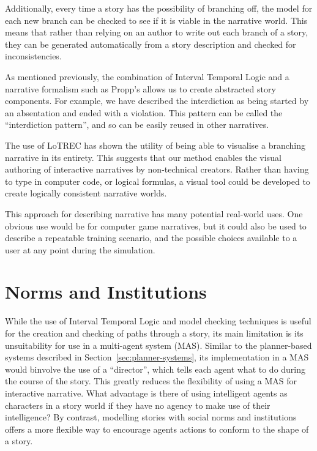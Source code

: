 \documentclass[11pt]{report}
\begin{document}
Additionally, every time a story has the possibility of branching off, the model for each new branch can be checked to see if it is viable in the narrative world. This means that rather than relying on an author to write out each branch of a story, they can be generated automatically from a story description and checked for inconsistencies.

As mentioned previously, the combination of Interval Temporal Logic and a narrative formalism such as Propp's allows us to create abstracted story components. For example, we have described the interdiction as being started by an absentation and ended with a violation. This pattern can be called the ``interdiction pattern'', and so can be easily reused in other narratives.

The use of LoTREC has shown the utility of being able to visualise a branching narrative in its entirety. This suggests that our method enables the visual authoring of interactive narratives by non-technical creators. Rather than having to type in computer code, or logical formulas, a visual tool could be developed to create logically consistent narrative worlds.

This approach for describing narrative has many potential real-world uses. One obvious use would be for computer game narratives, but it could also be used to describe a repeatable training scenario, and the possible choices available to a user at any point during the simulation.

\section{Norms and Institutions}
\label{sec:norms-and-institutions}

While the use of Interval Temporal Logic and model checking techniques is useful
for the creation and checking of paths through a story, its main limitation is
its unsuitability for use in a multi-agent system (MAS). Similar to the
planner-based systems described in Section~\ref{sec:planner-systems}, its implementation in a MAS
would binvolve the use of a ``director'', which tells each agent what to do
during the course of the story. This greatly reduces the flexibility of using a
MAS for interactive narrative. What advantage is there of using intelligent
agents as characters in a story world if they have no agency to make use of
their intelligence? By contrast, modelling stories with social norms and
institutions offers a more flexible way to encourage agents actions to conform
to the shape of a story.
\end{document}
